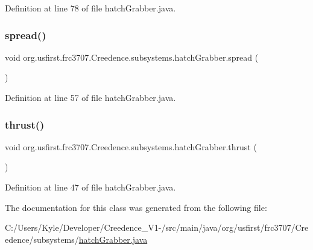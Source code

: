 Definition at line 78 of file hatch\+Grabber.\+java.

\mbox{\label{classorg_1_1usfirst_1_1frc3707_1_1_creedence_1_1subsystems_1_1hatch_grabber_acf96dcaf3a80776bfdcad24ea771003e}} 
\subsubsection{\texorpdfstring{spread()}{spread()}}
{\footnotesize\ttfamily void org.\+usfirst.\+frc3707.\+Creedence.\+subsystems.\+hatch\+Grabber.\+spread (\begin{DoxyParamCaption}{ }\end{DoxyParamCaption})}



Definition at line 57 of file hatch\+Grabber.\+java.

\mbox{\label{classorg_1_1usfirst_1_1frc3707_1_1_creedence_1_1subsystems_1_1hatch_grabber_a150bc67ff17ba2055df49e773dc941a0}} 
\subsubsection{\texorpdfstring{thrust()}{thrust()}}
{\footnotesize\ttfamily void org.\+usfirst.\+frc3707.\+Creedence.\+subsystems.\+hatch\+Grabber.\+thrust (\begin{DoxyParamCaption}{ }\end{DoxyParamCaption})}



Definition at line 47 of file hatch\+Grabber.\+java.



The documentation for this class was generated from the following file\+:\begin{DoxyCompactItemize}
\item 
C\+:/\+Users/\+Kyle/\+Developer/\+Creedence\+\_\+\+V1-\//src/main/java/org/usfirst/frc3707/\+Creedence/subsystems/\mbox{\hyperlink{hatch_grabber_8java}{hatch\+Grabber.\+java}}\end{DoxyCompactItemize}
